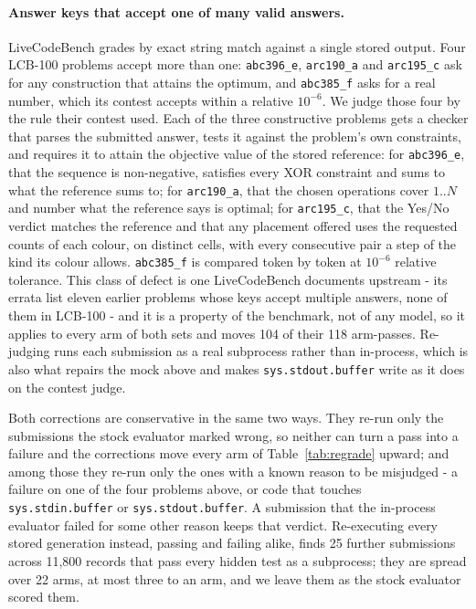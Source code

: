 \documentclass{article}
\begin{document}
\paragraph{Answer keys that accept one of many valid answers.} LiveCodeBench grades by exact
string match against a single stored output. Four LCB-100 problems accept more than one:
\texttt{abc396\_e}, \texttt{arc190\_a} and \texttt{arc195\_c} ask for any construction that
attains the optimum, and \texttt{abc385\_f} asks for a real number, which its contest accepts
within a relative $10^{-6}$. We judge those four by the rule their contest used. Each of the three
constructive problems gets a checker that parses the submitted answer, tests it against the
problem's own constraints, and requires it to attain the objective value of the stored reference:
for \texttt{abc396\_e}, that the sequence is non-negative, satisfies every XOR constraint and sums
to what the reference sums to; for \texttt{arc190\_a}, that the chosen operations cover $1..N$ and
number what the reference says is optimal; for \texttt{arc195\_c}, that the Yes/No verdict matches
the reference and that any placement offered uses the requested counts of each colour, on distinct
cells, with every consecutive pair a step of the kind its colour allows. \texttt{abc385\_f} is
compared token by token at $10^{-6}$ relative tolerance. This class of defect is one LiveCodeBench documents upstream - its errata
list eleven earlier problems whose keys accept multiple answers, none of them in LCB-100 - and
it is a property of the benchmark, not of any model, so it applies to every arm of both sets and
moves 104 of their 118 arm-passes. Re-judging
runs each submission as a real subprocess rather than in-process, which is also what repairs the
mock above and makes \texttt{sys.stdout.buffer} write as it does on the contest judge.

Both corrections are conservative in the same two ways. They re-run only the submissions the stock
evaluator marked wrong, so neither can turn a pass into a failure and the corrections move every
arm of Table~\ref{tab:regrade} upward; and among those they re-run only
the ones with a known reason to be misjudged - a failure on one of the four problems above, or
code that touches \texttt{sys.stdin.buffer} or \texttt{sys.stdout.buffer}. A submission that the
in-process evaluator failed for some other reason keeps that verdict. Re-executing every stored
generation instead, passing and failing alike, finds 25 further submissions across 11{,}800
records that pass every hidden test as a subprocess; they are spread over 22 arms, at most three
to an arm, and we leave them as the stock evaluator scored them.
\end{document}
